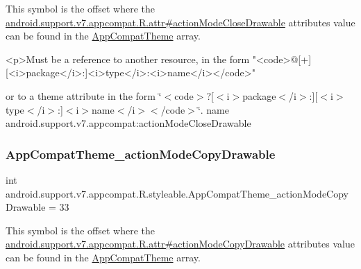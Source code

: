 This symbol is the offset where the \hyperlink{classandroid_1_1support_1_1v7_1_1appcompat_1_1R_1_1attr_a02eb886de7c9d0c93fe17338af168f46}{android.\+support.\+v7.\+appcompat.\+R.\+attr\#action\+Mode\+Close\+Drawable} attribute\textquotesingle{}s value can be found in the \hyperlink{classandroid_1_1support_1_1v7_1_1appcompat_1_1R_1_1styleable_a5c42f89e8a410c323be34208d75c430b}{App\+Compat\+Theme} array.

\begin{DoxyVerb}      <p>Must be a reference to another resource, in the form "<code>@[+][<i>package</i>:]<i>type</i>:<i>name</i></code>"
\end{DoxyVerb}
 or to a theme attribute in the form \char`\"{}$<$code$>$?\mbox{[}$<$i$>$package$<$/i$>$\+:\mbox{]}\mbox{[}$<$i$>$type$<$/i$>$\+:\mbox{]}$<$i$>$name$<$/i$>$$<$/code$>$\char`\"{}.  name android.\+support.\+v7.\+appcompat\+:action\+Mode\+Close\+Drawable \mbox{\label{classandroid_1_1support_1_1v7_1_1appcompat_1_1R_1_1styleable_a956a19fc927aa002ea6418adb5800157}} 
\subsubsection{\texorpdfstring{App\+Compat\+Theme\+\_\+action\+Mode\+Copy\+Drawable}{AppCompatTheme\_actionModeCopyDrawable}}
{\footnotesize\ttfamily int android.\+support.\+v7.\+appcompat.\+R.\+styleable.\+App\+Compat\+Theme\+\_\+action\+Mode\+Copy\+Drawable = 33\hspace{0.3cm}{\ttfamily [static]}}

This symbol is the offset where the \hyperlink{classandroid_1_1support_1_1v7_1_1appcompat_1_1R_1_1attr_ae03dbdfc7235f1d244357a9d8a548519}{android.\+support.\+v7.\+appcompat.\+R.\+attr\#action\+Mode\+Copy\+Drawable} attribute\textquotesingle{}s value can be found in the \hyperlink{classandroid_1_1support_1_1v7_1_1appcompat_1_1R_1_1styleable_a5c42f89e8a410c323be34208d75c430b}{App\+Compat\+Theme} array.

